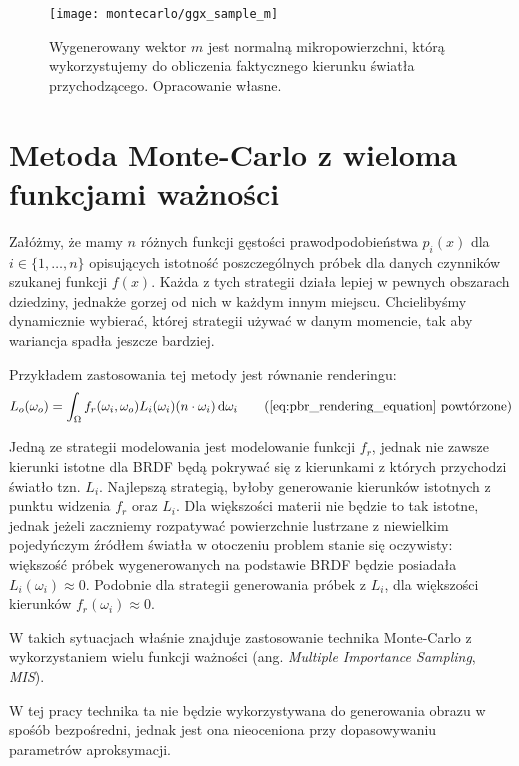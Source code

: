 \documentclass[../main.tex]{subfiles}
\begin{document}
\begin{figure}[h]
    \centering
    \texttt{[image: montecarlo/ggx\_sample\_m]}
    \caption{Wygenerowany wektor $m$ jest normalną mikropowierzchni, którą wykorzystujemy do obliczenia faktycznego kierunku światła przychodzącego. Opracowanie własne.}
    \label{fig:GGXSampleMReflect}
\end{figure}

\section{Metoda Monte-Carlo z wieloma funkcjami ważności}
\label{Chapter:MIS}

Załóżmy, że mamy $n$ różnych funkcji gęstości prawodpodobieństwa $p_{i}(x)$ dla $i \in \{ 1, \ldots, n \}$ opisujących istotność poszczególnych próbek dla danych czynników szukanej funkcji $f(x)$. Każda z tych strategii działa lepiej w pewnych obszarach dziedziny, jednakże gorzej od nich w każdym innym miejscu. Chcielibyśmy dynamicznie wybierać, której strategii używać w danym momencie, tak aby wariancja spadła jeszcze bardziej.

Przykładem zastosowania tej metody jest równanie renderingu:
\begin{equation*}
L_{o}(\omega_o) =
\int_{\Omega} {
    f_r(\omega_i, \omega_o)
    L_i(\omega_i)
    (n \cdot \omega_i)
    \dd{\omega_i}
}
\tag{\ref{eq:pbr_rendering_equation} powtórzone}
\end{equation*}

Jedną ze strategii modelowania jest modelowanie funkcji $f_r$, jednak nie zawsze kierunki istotne dla BRDF będą pokrywać się z kierunkami z których przychodzi światło tzn. $L_i$. Najlepszą strategią, byłoby generowanie kierunków istotnych z punktu widzenia $f_r$ oraz $L_i$. Dla większości materii nie będzie to tak istotne, jednak jeżeli zaczniemy rozpatywać powierzchnie lustrzane z niewielkim pojedyńczym źródłem światła w otoczeniu problem stanie się oczywisty: większość próbek wygenerowanych na podstawie BRDF będzie posiadała $L_i(\omega_i) \approx 0$. Podobnie dla strategii generowania próbek z $L_i$, dla większości kierunków $f_r(\omega_i) \approx 0$.

W takich sytuacjach właśnie znajduje zastosowanie technika Monte-Carlo z wykorzystaniem wielu funkcji ważności (ang. \textit{Multiple Importance Sampling}, \textit{MIS}).

W tej pracy technika ta nie będzie wykorzystywana do generowania obrazu w spośób bezpośredni, jednak jest ona nieoceniona przy dopasowywaniu parametrów aproksymacji.
\end{document}

